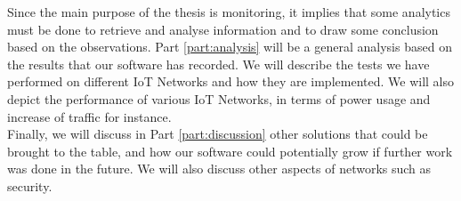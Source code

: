 Since the main purpose of the thesis is monitoring, it implies that some analytics must be done to retrieve and analyse information and to draw some conclusion based on the observations. Part \ref{part:analysis} will be a general analysis based on the results that our software has recorded. We will describe the tests we have performed on different IoT Networks and how they are implemented. We will also depict the performance of various IoT Networks, in terms of power usage and increase of traffic for instance.\\

Finally, we will discuss in Part \ref{part:discussion} other solutions that could be brought to the table, and how our software could potentially grow if further work was done in the future. We will also discuss other aspects of networks such as security.
